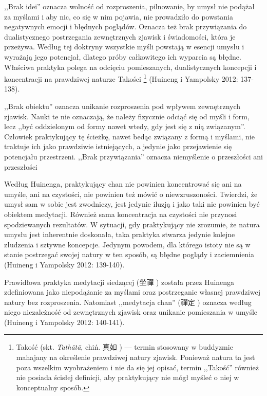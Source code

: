 ,,Brak idei'' oznacza wolność od rozproszenia, pilnowanie, by umysł nie podążał za myślami i aby nic, co się w nim pojawia, nie prowadziło do powstania negatywnych emocji i błędnych poglądów.
Oznacza też brak przywiązania do dualistycznego postrzegania zewnętrznych zjawisk i świadomości, która je przeżywa.
Według tej doktryny wszystkie myśli powstają w esencji umysłu i wyrażają jego potencjał, dlatego próby całkowitego ich wyparcia są błędne.
Właściwa praktyka polega na odcięciu pomieszanych, dualistycznych koncepcji i koncentracji na prawdziwej naturze Takości%
\footnote{Takość (skt. \textit{Tathātā}, chiń. 真如 ) --- termin stosowany w buddyzmie mahajany na określenie prawdziwej natury zjawisk. Ponieważ natura ta jest poza wszelkim wyobrażeniem i nie da się jej opisać,  termin ,,Takość'' również nie posiada ścisłej definicji, aby praktykujący nie mógł myśleć o niej w konceptualny sposób.}
(Huineng i Yampolsky 2012: 137-138).

,,Brak obiektu'' oznacza unikanie rozproszenia pod wpływem zewnętrznych zjawisk. Nauki te nie oznaczają, że należy fizycznie odciąć się od myśli i form, lecz ,,być oddzielonym od formy nawet wtedy, gdy jest się z nią związanym''. Człowiek praktykujący tę ścieżkę, nawet bedąc związany z formą i myślami, nie traktuje ich jako prawdziwie istniejących, a jedynie jako przejawienie się potencjału przestrzeni. ,,Brak przywiązania'' oznacza niemyślenie o przeszłości ani przeszłości\ibid

Według Huinenga, praktykujący chan nie powinien koncentrować się ani na umyśle, ani na czystości, nie powinien też mówić o niewzruszoności. Twierdzi, że umysł sam w sobie jest zwodniczy, jest jedynie iluzją i jako taki nie powinien być obiektem medytacji. Również sama koncentracja na czystości nie przynosi spodziewanych rezultatów. W sytuacji, gdy praktykujący nie zrozumie, że natura umysłu jest inherentnie doskonała, taka praktyka stwarza jedynie kolejne złudzenia i sztywne koncepcje. Jedynym powodem, dla którego istoty nie są w stanie postrzegać swojej natury w ten sposób, są błędne poglądy i zaciemnienia (Huineng i Yampolsky 2012: 139-140).

Prawidłowa praktyka medytacji siedzącej (坐禪 ) została przez Huinenga zdefiniowana jako niepodążanie za myślami oraz postrzeganie własnej prawdziwej natury bez rozproszenia. Natomiast ,,medytacja chan'' (禪定 ) oznacza według niego niezależność od zewnętrznych zjawisk oraz unikanie pomieszania w umyśle (Huineng i Yampolsky 2012: 140-141).

